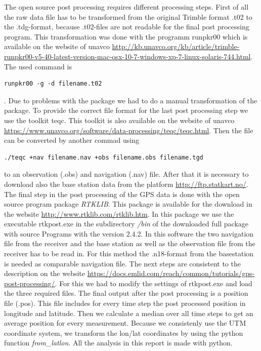 The open source post processing requires different processing steps.
First of all the raw data file has to be transformed from the original Trimble format .t02 to the .tdg-format, because .t02-files are not readable for the final post processing program.
This transformation was done with the programm  runpkr00  which is available on the website of unavco \url{http://kb.unavco.org/kb/article/trimble-runpkr00-v5-40-latest-version-mac-osx-10-7-windows-xp-7-linux-solaris-744.html}.
The used command is 
\begin{verbatim} 
runpkr00 -g -d filename.t02 
\end{verbatim}.
Due to problems with the package we had to do a manual transformation of the package.
To provide the correct file format for the last post processing step we use the toolkit teqc.
This toolkit is also available on the website of unavco \url{https://www.unavco.org/software/data-processing/teqc/teqc.html}.
Then the file can be converted by another commad using
\begin{verbatim}
./teqc +nav filename.nav +obs filename.obs filename.tgd
\end{verbatim} 
to an observation (.obs) and navigation (.nav) file.
After that it is necessary to download also the base station data from the platform \url{http://ftp.statkart.no/}.
The final step in the post processing of the GPS data is done with the open source program package \textit{RTKLIB}.
This package is available for the download in the website \url{http://www.rtklib.com/rtklib.htm}.
In this package we use the executable rtkpost.exe in the subdirectory \textit{/bin} of the downloaded full package with source Programs with the version 2.4.2.
In this software the two navigation file from the receiver and the base station as well as the observation file from the receiver has to be read in.
For this method the .n18-format from the basestation is needed as comparable navigation file.
The next steps are consistent to the description on the website \url{https://docs.emlid.com/reach/common/tutorials/gps-post-processing/}.
For this we had to modify the settings of rtkpost.exe and load the three required files. 
The final output after the post processing is a position file (.pos). 
This file includes for every time step the post processed position in longitude and latitude.
Then we calculate a median over all time steps to get an average position for every measurement.
Because we consistenly use the UTM coordinate system, we transform the lon/lat coordinates by using the python function \textit{from\_latlon}.
All the analysis in this report is made with python.\medskip

